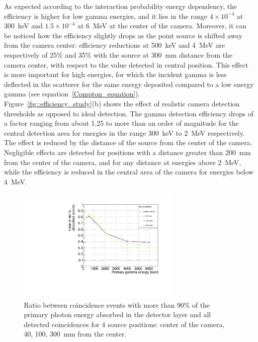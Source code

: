 As expected according to the interaction probability energy dependency, the efficiency is higher for low gamma energies, and it lies in the range $4\times10^{-4}$ at 300~keV and $1.5\times10^{-4}$ at 6~MeV at the center of the camera. Moreover, it can be noticed how the efficiency slightly drops as the point source is shifted away from the camera center: efficiency reductions at 500~keV and 4~MeV are respectively of 25\% and 35\% with the source at 300~mm distance from the camera center, with respect to the value detected in central position. This effect is more important for high energies, for which the incident gamma is less deflected in the scatterer for the same energy deposited compared to a low energy gamma (see equation~\ref{Compton_equation}).\\  
Figure~\ref{fig::efficiency_study}(b) shows the effect of realistic camera detection thresholds as opposed to ideal detection. The gamma detection efficiency drops of a factor ranging from about 1.25 to more than an order of magnitude for the central detection area for energies in the range 300~keV to 2~MeV respectively. The effect is reduced by the distance of the source from the center of the camera. Negligible effects are detected for positions with a distance greater than 200~mm from the center of the camera, and for any distance at energies above 2~MeV, while the efficiency is reduced in the central area of the camera for energies below 4~MeV.\\

\begin{figure} [!hbtp]	
\centering
\includegraphics[width=0.7\textwidth]{./Figure/new/rate_90percent_energy_4distances.pdf}
\caption{Ratio between coincidence events with more than 90\% of the primary photon energy absorbed in the detector layer and all detected coincidences for 4 source positions: center of the camera, 40, 100, 300~mm from the center.}
\label{fig::rate_full_abs}
\end{figure}


